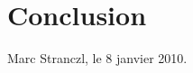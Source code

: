 \chapter{Conclusion}
\label{conclusion}
\thispagestyle{empty}



\noindent Marc Stranczl, le 8 janvier 2010. 


